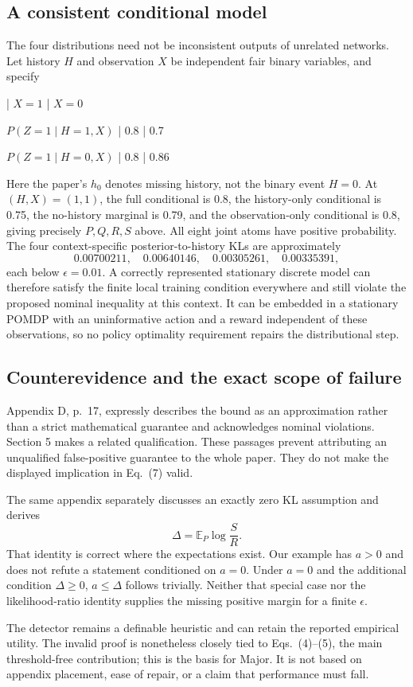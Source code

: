 \documentclass[10pt]{article}
\begin{document}
\subsection*{A consistent conditional model}
The four distributions need not be inconsistent outputs of unrelated networks. Let history \(H\) and observation \(X\) be independent fair binary variables, and specify\par
| \(X=1\) | \(X=0\)\par
\(P(Z=1\mid H=1,X)\) | 0.8 | 0.7\par
\(P(Z=1\mid H=0,X)\) | 0.8 | 0.86\par
Here the paper’s \(h_0\) denotes missing history, not the binary event \(H=0\). At \((H,X)=(1,1)\), the full conditional is 0.8, the history-only conditional is 0.75, the no-history marginal is 0.79, and the observation-only conditional is 0.8, giving precisely \(P,Q,R,S\) above. All eight joint atoms have positive probability. The four context-specific posterior-to-history KLs are approximately \[0.00700211,\quad0.00640146,\quad0.00305261,\quad0.00335391,\] each below \(\epsilon=0.01\). A correctly represented stationary discrete model can therefore satisfy the finite local training condition everywhere and still violate the proposed nominal inequality at this context. It can be embedded in a stationary POMDP with an uninformative action and a reward independent of these observations, so no policy optimality requirement repairs the distributional step.\par
\subsection*{Counterevidence and the exact scope of failure}
Appendix D, p. 17, expressly describes the bound as an approximation rather than a strict mathematical guarantee and acknowledges nominal violations. Section 5 makes a related qualification. These passages prevent attributing an unqualified false-positive guarantee to the whole paper. They do not make the displayed implication in Eq. (7) valid.\par
The same appendix separately discusses an exactly zero KL assumption and derives \[\Delta=\mathbb E_P\log\frac{S}{R}.\] That identity is correct where the expectations exist. Our example has \(a>0\) and does not refute a statement conditioned on \(a=0\). Under \(a=0\) and the additional condition \(\Delta\ge0\), \(a\le\Delta\) follows trivially. Neither that special case nor the likelihood-ratio identity supplies the missing positive margin for a finite \(\epsilon\).\par
The detector remains a definable heuristic and can retain the reported empirical utility. The invalid proof is nonetheless closely tied to Eqs. (4)–(5), the main threshold-free contribution; this is the basis for Major. It is not based on appendix placement, ease of repair, or a claim that performance must fall.\par
\end{document}
